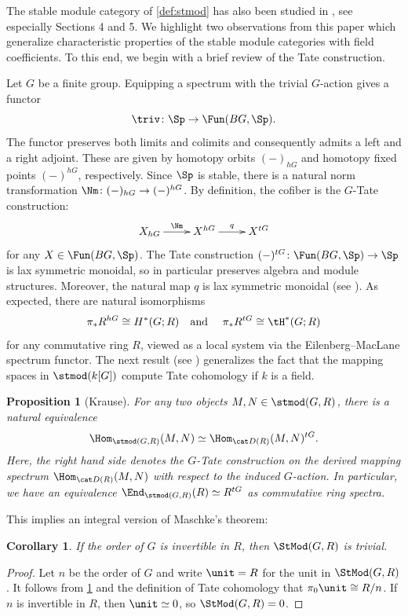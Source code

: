 \documentclass{amsart}%
\numberwithin{equation}{section}%
\newtheorem{Prop}[equation]{Proposition}
\newtheorem{Cor}[equation]{Corollary}
\theoremstyle{remark}
\begin{document}
The stable module category of \cref{def:stmod} has also been studied in \cite{krause_picard}, see especially Sections 4 and 5. We highlight two observations from this paper which generalize characteristic properties of the stable module categories with field coefficients. To this end, we begin with a brief review of the Tate construction. 

Let $G$ be a finite group. Equipping a spectrum with the trivial $G$-action gives a functor
\[
\triv\colon \Sp \to \Fun(BG,\Sp).
\]
The functor preserves both limits and colimits and consequently admits a left and a right adjoint. These are given by homotopy orbits $(-)_{hG}$ and homotopy fixed points $(-)^{hG}$, respectively. Since $\Sp$ is stable, there is a natural norm transformation $\Nm\colon (-)_{hG} \to (-)^{hG}$. By definition, the cofiber is the $G$-Tate construction:
\[
\xymatrix{X_{hG} \ar[r]^-{\Nm} & X^{hG} \ar[r]^-q & X^{tG}}
\]
for any $X \in \Fun(BG,\Sp)$. The Tate construction $(-)^{tG}\colon \Fun(BG,\Sp) \to \Sp$ is lax symmetric monoidal, so in particular preserves algebra and module structures. Moreover, the natural map $q$ is lax symmetric monoidal (see \cite[\S I.3]{NikolausScholze18}). As expected, there are natural isomorphisms
\begin{equation}\label{eq:tatecohom}
\pi_*R^{hG} \cong H^*(G;R) \quad \text{and } \quad \pi_*R^{tG} \cong \tH^*(G;R)
\end{equation}
for any commutative ring $R$, viewed as a local system via the Eilenberg--MacLane spectrum functor. The next result (see \cite[Lem.~4.2]{krause_picard}) generalizes the fact that the mapping spaces in $\stmod(k[G])$ compute Tate cohomology if $k$ is a field.

\begin{Prop}[Krause]\label{prop:stmodtate}
For any two objects $M,N \in \stmod(G,R)$, there is a natural equivalence
    \[
    \Hom_{\stmod(G,R)}(M,N) \simeq \Hom_{\cat D(R)}(M,N)^{tG}.
    \]
Here, the right hand side denotes the $G$-Tate construction on the derived mapping spectrum $\Hom_{\cat D(R)}(M,N)$ with respect to the induced $G$-action. In particular, we have an equivalence $\End_{\stmod(G,R)}(R) \simeq R^{tG}$ as commutative ring spectra.
\end{Prop}

This implies an integral version of Maschke's theorem:

\begin{Cor}\label{cor:stmodcharacteristic}
If the order of $G$ is invertible in $R$, then $\StMod(G,R)$ is trivial. 
\end{Cor}
\begin{proof}
Let $n$ be the order of $G$ and write $\unit = R$ for the unit in $\StMod(G,R)$. It follows from \cref{prop:stmodtate} and the definition of Tate cohomology that $\pi_0\unit \cong R/n$. If $n$ is invertible in $R$, then $\unit \simeq 0$, so $\StMod(G,R) = 0$.
\end{proof}
\end{document}
